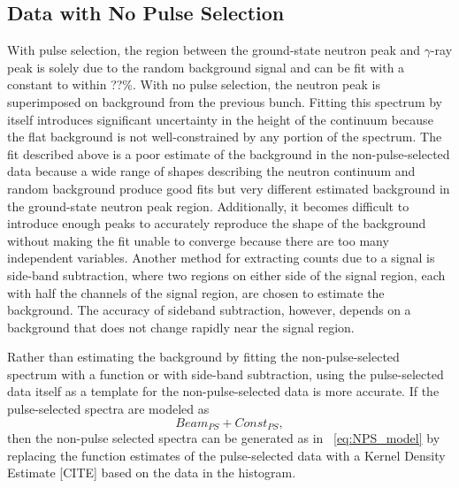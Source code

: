 \subsection{Data with No Pulse Selection}
With pulse selection, the region between the ground-state neutron peak and $\gamma$-ray peak is solely due to the random background signal and can be fit with a constant to within ??\%.  With no pulse selection, the neutron peak is superimposed on background from the previous bunch.  Fitting this spectrum by itself introduces significant uncertainty in the height of the continuum because the flat background is not well-constrained by any portion of the spectrum.  The fit described above is a poor estimate of the background in the non-pulse-selected data because a wide range of shapes describing the neutron continuum and random background produce good fits but very different estimated background in the ground-state neutron peak region.  Additionally, it becomes difficult to introduce enough peaks to accurately reproduce the shape of the background without making the fit unable to converge because there are too many independent variables.  Another method for extracting counts due to a signal is side-band subtraction, where two regions on either side of the signal region, each with half the channels of the signal region, are chosen to estimate the background.  The accuracy of sideband subtraction, however, depends on a background that does not change rapidly near the signal region. 

Rather than estimating the background by fitting the non-pulse-selected spectrum with a function or with side-band subtraction, using the pulse-selected data itself as a template for the non-pulse-selected data is more accurate.  If the pulse-selected spectra are modeled as
\begin{equation}
Beam_{PS} + Const_{PS},
\end{equation}
then the non-pulse selected spectra can be generated as in {\eqn}~\ref{eq:NPS_model} by replacing the function estimates of the pulse-selected data with a Kernel Density Estimate [CITE] based on the data in the histogram.  

